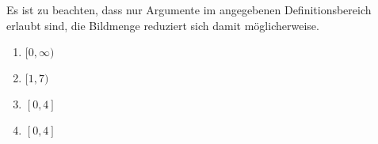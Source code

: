 \item Es ist zu beachten, dass nur Argumente im angegebenen Definitionsbereich erlaubt sind, die Bildmenge reduziert sich damit möglicherweise.
\begin{enumerate}
\item $[0, \infty)$
\item $[1,7)$
\item $[0,4]$
\item $[0,4]$
\end{enumerate}

